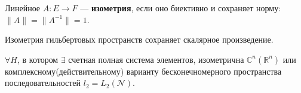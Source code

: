 \begin{to_def}
	Линейное $A\colon E \to F$ --- \textbf{изометрия}, если оно биективно и сохраняет норму: $\|A\| = \|A^{-1}\| = 1$.
\end{to_def}

\begin{to_lem}
	Изометрия гильбертовых пространств сохраняет скалярное произведение.
\end{to_lem}

\begin{to_thr}
	$\forall H$, в котором $\exists$ счетная полная система элементов, изометрична $\mathbb{C}^n (\mathbb{R}^n)$ или комплексному(действительному) варианту бесконечномерного пространства последовательностей $l_2 = L_2(\mathcal{N})$.
\end{to_thr}